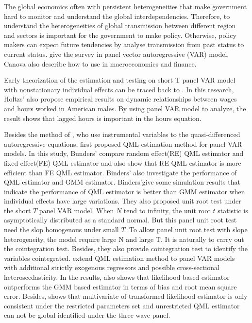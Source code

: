 \documentclass[12pt,a4paper,hyperref]{article}
\begin{document}
The global economics often with persistent heterogeneities that make government hard to monitor and understand the global interdependencies. Therefore, to understand the heterogeneities of global transmission between different region and sectors is important for the government to make policy. Otherwise, policy makers can expect future tendencies by analyse transmission from past status to current status. \citet{Canova:2013} give the survey in panel vector autoregressive (VAR) model. Canova also describe how to use in macroeconomics and finance.

Early theorization of the estimation and testing on short T panel VAR model with nonstationary individual effects can be traced back to \citet{Holtz:1988}. In this research,
Holtzs’ also propose empirical results on dynamic relationships between wages and hours worked in American males. By using panel VAR model to analyze, the result shows that lagged hours is important in the hours equation.

Besides the method of \citet{Holtz:1988}, who use instrumental variables to the quasi-differenced autoregressive equations, \citet{Binder:2005} first proposed QML estimation method for panel VAR models. In this study, Bunders’ compare random effect(RE) QML estimator and fixed effect(FE) QML estimator and also show that RE QML estimator is more efficient than FE QML estimator.
Binders’ also investigate the performance of QML estimator and GMM estimator. Binders’give some simulation results that indicate the performance of QML estimator is better than GMM estimator when individual effects have large variations. They also proposed unit root test under the short $T$ panel VAR model. When $N$ tend to infinity, the unit root $t$ statistic is asymptotically distributed as a standard normal. But this panel unit root test need the slop homogenous under small $T$. To allow panel unit root test with slope heterogeneity, the model require large N and large T. It is naturally to carry out the cointegration test. Besides, they also provide cointegration test to identify the variables cointegrated. \citet{Juodis:2017} extend QML estimation method to panel VAR models with additional strictly exogenous regressors and possible cross-sectional heteroscedasticity. In the results, \citet{ Juodis:2017} also shows that likelihood based estimator outperforms the GMM based estimator in terms of bias and root mean square error. Besides, \citet{ Juodis:2017} shows that multivariate of transformed likelihood estimator is only consistent under the restricted parameters set and unrestricted QML estimator can not be global identified under the three wave panel.
\end{document}
